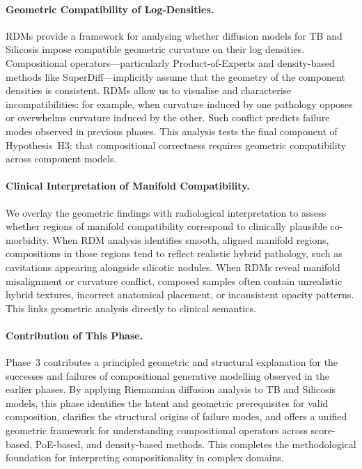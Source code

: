 \paragraph{Geometric Compatibility of Log-Densities.}
RDMs provide a framework for analysing whether diffusion models for TB and
Silicosis impose compatible geometric curvature on their log densities.
Compositional operators—particularly Product-of-Experts and density-based
methods like SuperDiff—implicitly assume that the geometry of the component
densities is consistent. RDMs allow us to visualise and characterise
incompatibilities: for example, when curvature induced by one pathology opposes
or overwhelms curvature induced by the other. Such conflict predicts failure
modes observed in previous phases. This analysis tests the final component of
Hypothesis~H3: that compositional correctness requires geometric compatibility
across component models.

\paragraph{Clinical Interpretation of Manifold Compatibility.}
We overlay the geometric findings with radiological interpretation to assess
whether regions of manifold compatibility correspond to clinically plausible
co-morbidity. When RDM analysis identifies smooth, aligned manifold regions,
compositions in those regions tend to reflect realistic hybrid pathology, such
as cavitations appearing alongside silicotic nodules. When RDMs reveal manifold
misalignment or curvature conflict, composed samples often contain unrealistic
hybrid textures, incorrect anatomical placement, or inconsistent opacity
patterns. This links geometric analysis directly to clinical semantics.

\paragraph{Contribution of This Phase.}
Phase~3 contributes a principled geometric and structural explanation for the
successes and failures of compositional generative modelling observed in the
earlier phases. By applying Riemannian diffusion analysis to TB and Silicosis
models, this phase identifies the latent and geometric prerequisites for valid
composition, clarifies the structural origins of failure modes, and offers a
unified geometric framework for understanding compositional operators across
score-based, PoE-based, and density-based methods. This completes the
methodological foundation for interpreting compositionality in complex domains.
